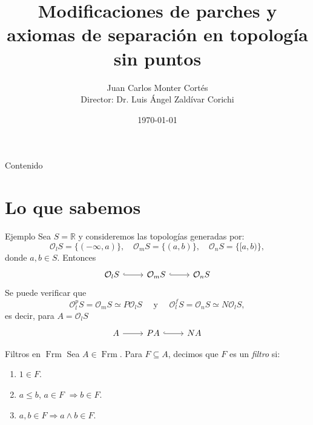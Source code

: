\documentclass[compress,12pt]{beamer}
\title{Modificaciones de parches y axiomas de separación en topología sin puntos}
\date{\today}
\author{Juan Carlos Monter Cortés \\ Director: Dr. Luis Ángel Zaldívar Corichi}
\institute{Universidad de Guadalajara}
\DeclareMathOperator{\Frm}{Frm}
\begin{document}
\frame[plain]{\titlepage}

\begin{frame}{Contenido}
\tableofcontents %
\end{frame}

\section{Lo que sabemos}
\begin{frame}[fragile]{Ejemplo}
Sea $S=\mathbb{R}$ y consideremos las topologías generadas por:
\[
\mathcal{O}_lS=\{(-\infty, a)\},\quad  \mathcal{O}_mS=\{(a,b)\}, \quad \mathcal{O}_nS=\{[a,b)\},
\]
donde $a,b\in S$. Entonces 
\[\begin{tikzcd}
	{\mathcal{O}_lS} & {\mathcal{O}_mS} & {\mathcal{O}_nS}
	\arrow[hook, from=1-1, to=1-2]
	\arrow[hook, from=1-2, to=1-3]
\end{tikzcd}\]
Se puede verificar que 
\[
\mathcal{O}_l^pS=\mathcal{O}_mS\simeq P\mathcal{O}_lS\quad\mbox{ y }\quad\mathcal{O}_l^fS=\mathcal{O}_nS\simeq N\mathcal{O}_lS,
\]
es decir, para $A=\mathcal{O}_lS$
\[\begin{tikzcd}
	{A} & {PA} & {NA}
	\arrow[from=1-1, to=1-2]
	\arrow[hook, from=1-2, to=1-3]
\end{tikzcd}\]
\end{frame}

\begin{frame}{Filtros en $\Frm$}
    Sea $A\in \Frm$. Para $F\subseteq A$, decimos que $F$ es un \emph{filtro} si:
		\begin{enumerate}
			\item $1\in F$.
			\item $a\leq b$, $a\in  F$ $\Rightarrow b \in F$.
			\item $a, b \in F \Rightarrow  a \wedge b \in F$.
		\end{enumerate}
\end{frame}
\end{document}
